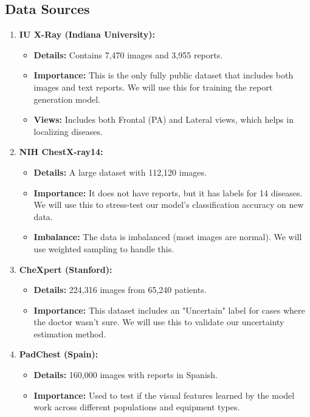\documentclass[11pt,a4paper]{article}
\begin{document}
\subsection{Data Sources}
\begin{enumerate}
    \item \textbf{IU X-Ray (Indiana University):}
    \begin{itemize}
        \item \textbf{Details:} Contains 7,470 images and 3,955 reports.
        \item \textbf{Importance:} This is the only fully public dataset that includes both images and text reports. We will use this for training the report generation model.
        \item \textbf{Views:} Includes both Frontal (PA) and Lateral views, which helps in localizing diseases.
    \end{itemize}
    
    \item \textbf{NIH ChestX-ray14:}
    \begin{itemize}
        \item \textbf{Details:} A large dataset with 112,120 images.
        \item \textbf{Importance:} It does not have reports, but it has labels for 14 diseases. We will use this to stress-test our model's classification accuracy on new data.
        \item \textbf{Imbalance:} The data is imbalanced (most images are normal). We will use weighted sampling to handle this.
    \end{itemize}

    \item \textbf{CheXpert (Stanford):}
    \begin{itemize}
        \item \textbf{Details:} 224,316 images from 65,240 patients.
        \item \textbf{Importance:} This dataset includes an "Uncertain" label for cases where the doctor wasn't sure. We will use this to validate our uncertainty estimation method.
    \end{itemize}
    
    \item \textbf{PadChest (Spain):}
    \begin{itemize}
        \item \textbf{Details:} 160,000 images with reports in Spanish.
        \item \textbf{Importance:} Used to test if the visual features learned by the model work across different populations and equipment types.
    \end{itemize}
\end{enumerate}
\end{document}

